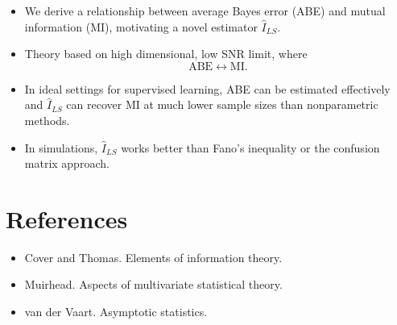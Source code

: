 \documentclass[12pt]{article}
\begin{document}
\begin{itemize}
\item We derive a relationship between average Bayes error (ABE) and mutual
  information (MI), motivating a novel estimator $\hat{I}_{LS}$.
\item Theory based on high dimensional, low SNR limit,
where \[\text{ABE} \leftrightarrow \text{MI}.\]
\item In ideal settings for supervised learning, ABE can be estimated
  effectively and $\hat{I}_{LS}$ can recover MI at much lower sample
  sizes than nonparametric methods.
\item In simulations, $\hat{I}_{LS}$ works better than Fano's
  inequality or the confusion matrix approach.
\end{itemize}

\section{References}
\begin{itemize}
\item Cover and Thomas.  Elements of information theory.
\item Muirhead.  Aspects of multivariate statistical theory.
\item van der Vaart.  Asymptotic statistics.
\end{itemize}
\end{document}
